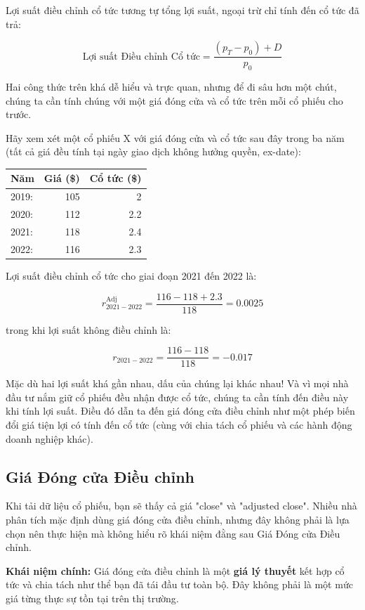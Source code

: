 Lợi suất điều chỉnh cổ tức tương tự tổng lợi suất, ngoại trừ chỉ tính đến cổ tức đã trả:

$$
\text{Lợi suất Điều chỉnh Cổ tức} = \frac{(p_{T} - p_{0}) + D}{p_{0}}
$$

Hai công thức trên khá dễ hiểu và trực quan, nhưng để đi sâu hơn một chút, chúng ta cần tính chúng với một giá đóng cửa và cổ tức trên mỗi cổ phiếu cho trước.

Hãy xem xét một cổ phiếu X với giá đóng cửa và cổ tức sau đây trong ba năm (tất cả giá đều tính tại ngày giao dịch không hưởng quyền, ex-date):

\begin{center}
\begin{tabular}{lrr}
\toprule
Năm & Giá (\$) & Cổ tức (\$) \\
\midrule
2019: & 105 & 2 \\
2020: & 112 & 2.2 \\
2021: & 118 & 2.4 \\
2022: & 116 & 2.3 \\
\bottomrule
\end{tabular}
\end{center}

Lợi suất điều chỉnh cổ tức cho giai đoạn 2021 đến 2022 là:

$$
r^{\text{Adj}}_{2021 - 2022} = \frac{116 - 118 + 2.3}{118} = 0.0025
$$

trong khi lợi suất không điều chỉnh là:

$$
r_{2021 - 2022} = \frac{116 - 118}{118} = -0.017
$$

Mặc dù hai lợi suất khá gần nhau, dấu của chúng lại khác nhau! Và vì mọi nhà đầu tư nắm giữ cổ phiếu đều nhận được cổ tức, chúng ta cần tính đến điều này khi tính lợi suất. Điều đó dẫn ta đến giá đóng cửa điều chỉnh như một phép biến đổi giá tiện lợi có tính đến cổ tức (cùng với chia tách cổ phiếu và các hành động doanh nghiệp khác).

\subsection{Giá Đóng cửa Điều chỉnh}

Khi tải dữ liệu cổ phiếu, bạn sẽ thấy cả giá "close" và "adjusted close". Nhiều nhà phân tích mặc định dùng giá đóng cửa điều chỉnh, nhưng đây không phải là lựa chọn nên thực hiện mà không hiểu rõ khái niệm đằng sau Giá Đóng cửa Điều chỉnh.

\textbf{Khái niệm chính:} Giá đóng cửa điều chỉnh là một \textbf{giá lý thuyết} kết hợp cổ tức và chia tách như thể bạn đã tái đầu tư toàn bộ. Đây không phải là một mức giá từng thực sự tồn tại trên thị trường.

